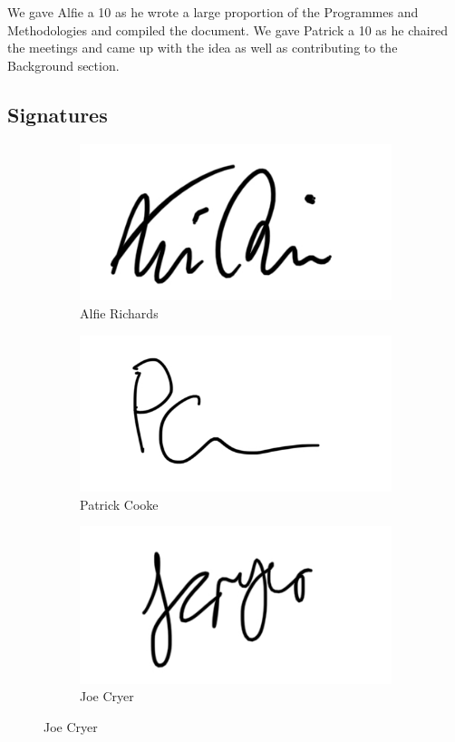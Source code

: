 \documentclass[10pt]{article}
\begin{document}
We gave Alfie a 10 as he wrote a large proportion of the Programmes and Methodologies and compiled 
the document. We gave Patrick a 10 as he chaired the meetings and came up with the idea as well as 
contributing to the Background section.

\subsection{Signatures}

\begin{center}
\begin{figure}[h]
  \centering

\begin{subfigure}{0.3\textwidth}
\includegraphics[width=0.9\linewidth]{SigAlfie}
\captionsetup{labelformat=empty}
\caption{Alfie Richards}
\end{subfigure}
\begin{subfigure}{0.3\textwidth}
\includegraphics[width=0.9\linewidth]{SigPatrick}
\captionsetup{labelformat=empty}
\caption{Patrick Cooke}
\end{subfigure}
\begin{subfigure}{0.3\textwidth}
\includegraphics[width=0.9\linewidth]{SigJoe}
\captionsetup{labelformat=empty}
\caption{Joe Cryer}
\end{subfigure}
\end{figure}


\end{center}
\end{document}
